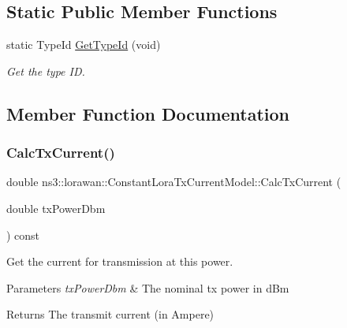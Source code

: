 \subsection*{Static Public Member Functions}
\begin{DoxyCompactItemize}
\item 
static Type\+Id \hyperlink{classns3_1_1lorawan_1_1ConstantLoraTxCurrentModel_aec6efa40cd05eaeecb90b111160e8630}{Get\+Type\+Id} (void)
\begin{DoxyCompactList}\small\item\em Get the type ID. \end{DoxyCompactList}\end{DoxyCompactItemize}


\subsection{Member Function Documentation}
\mbox{\label{classns3_1_1lorawan_1_1ConstantLoraTxCurrentModel_afd0b31a415eae9f95dd4464612925dad}} 
\subsubsection{\texorpdfstring{Calc\+Tx\+Current()}{CalcTxCurrent()}}
{\footnotesize\ttfamily double ns3\+::lorawan\+::\+Constant\+Lora\+Tx\+Current\+Model\+::\+Calc\+Tx\+Current (\begin{DoxyParamCaption}\item[{double}]{tx\+Power\+Dbm }\end{DoxyParamCaption}) const\hspace{0.3cm}{\ttfamily [virtual]}}

Get the current for transmission at this power.


\begin{DoxyParams}{Parameters}
{\em tx\+Power\+Dbm} & The nominal tx power in d\+Bm \\
\hline
\end{DoxyParams}
\begin{DoxyReturn}{Returns}
The transmit current (in Ampere) 
\end{DoxyReturn}


